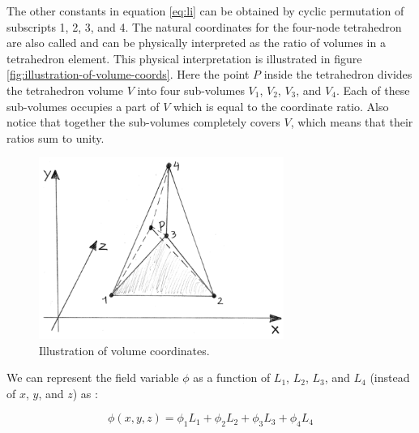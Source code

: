 The other constants in equation \eqref{eq:li} can be obtained by
cyclic permutation of subscripts 1, 2, 3, and 4.
%
The natural coordinates for the four-node tetrahedron are also called
 and can be physically interpreted as the
ratio of volumes in a tetrahedron element. This physical
interpretation is illustrated in figure
\vref{fig:illustration-of-volume-coords}. Here the point $P$ inside the
tetrahedron divides the tetrahedron volume $V$ into four sub-volumes
$V_1$, $V_2$, $V_3$, and $V_4$. Each of these sub-volumes occupies a
part of $V$ which is equal to the coordinate ratio. Also notice
that together the sub-volumes completely covers $V$, which means that
their ratios sum to unity.

\begin{figure}
  \centering
  \includegraphics[width=8cm]{./images/finite_element_method_illustration_of_volume_coords.png}
\caption{Illustration of volume coordinates.}
\label{fig:illustration-of-volume-coords}
\end{figure}

We can represent the field variable $\phi$ as a function of $L_1$,
$L_2$, $L_3$, and $L_4$ (instead of $x$, $y$, and $z$) as
:

\begin{equation}
\phi(x,y,z) = \phi_1 L_1 + \phi_2 L_2 + \phi_3 L_3 + \phi_4 L_4
\end{equation}


